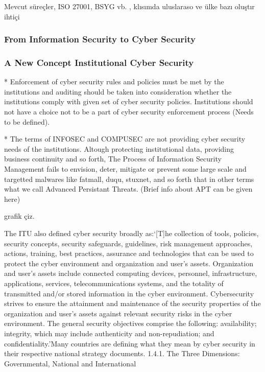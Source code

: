 \documentclass[journal]{IEEEtran}
\begin{document}
Mevcut süreçler, ISO 27001, BSYG vb.
,  klısımda uluslaraso  ve ülke bazı oluştır
ihtiçi


\subsubsection{From Information Security to Cyber Security}

\subsubsection{A New Concept Institutional Cyber Security}

* Enforcement of cyber security rules and policies must be met by the institutions and auditing should be taken into consideration whether the  institutions comply with given set of cyber security policies.  Institutions should not have a choice not to be a part of cyber security enforcement process (Needs to be defined).

* The terms of INFOSEC and COMPUSEC are not providing cyber security needs of the institutions. Altough protecting institutional data, providing business continuity and so forth, The Process of Information Security Management  fails to envision, deter, mitigate or prevent some large scale and targetted malwares like fatmall, duqu, stuxnet, and so forth that in other terms what we call Advanced Persistant Threats. (Brief info about APT can be given here)

grafik çiz.

The ITU also defined cyber security broadly as:‘[T]he collection of tools, policies, security concepts, security safeguards, guidelines, risk management approaches, actions, training, best practices, assurance and technologies that can be used to protect the cyber environment and organization and user’s assets. Organization and user’s assets include connected computing devices, personnel, infrastructure, applications, services, telecommunications systems, and the totality of transmitted and/or stored information in the cyber environment. Cybersecurity strives to ensure the attainment and maintenance of the security properties of the organization and user’s assets against relevant security risks in the cyber environment. The general security objectives comprise the following: availability; integrity, which may include authenticity and non-repudiation; and confidentiality.’Many countries are defining what they mean by cyber security in their respective national strategy documents.
\cite{kurt2012cyber}
1.4.1. The Three Dimensions: Governmental, National and  International
\end{document}
